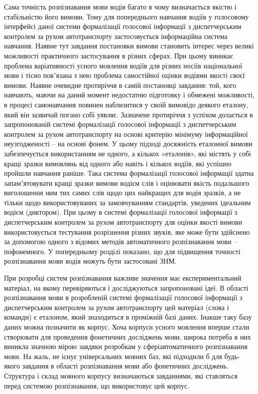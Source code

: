 Сама точність розпізнавання мови водія багато в чому визначається якістю і стабільністю його вимови. Тому для попереднього навчання водіїв у голосовому інтерфейсі даної системи формалізації голосової інформації з диспетчерським контролем за рухом автотранспорту застосовується інформаційна система навчання. Наявне тут завдання постановки вимови становить інтерес через великі можливості практичного застосування в різних сферах. При цьому виникає проблема варіативності усного мовлення водіїв для різних носіїв національної мови і тісно повʼязана з нею проблема самостійної оцінки водіями якості своєї вимови. Наявне очевидне протиріччя в самій постановці завдання: той, кого навчають, маючи  на даний момент недостатню підготовку і обмежені можливості, в процесі самонавчання повинен наблизитися у своїй вимовідо деякого еталону, який він  зазвичай погано собі уявляє. Зазначене протиріччя з успіхом долається в запропонованій системі формалізації голосової інформації з диспетчерським контролем за рухом автотранспорту на основі критерію мінімуму інформаційної неузгодженості – на основі фонем. У цьому підході досяжність еталонної вимови забезпечується використанням не одного, а кількох «еталонів», які містять у собі кращі зразки вимовлянь від одного або навіть і кількох водіїв, які успішно пройшли навчання раніше. Така система формалізації голосової інформації здатна запамʼятовувати кращі зразки вимови водієм слів і оцінювати якість подальшого виголошення ним тих самих слів щодо цих найкращих для водія зразків, а не тільки щодо використовуваних за замовчуванням стандартів, уведених ідеальним водієм (диктором). При цьому в системі формалізації голосової інформації з диспетчерським контролем за рухом автотранспорту для оцінки якості вимови використовується тестування розрізнення різних звуків, яке може бути здійснено за допомогою одного з відомих методів автоматичного розпізнавання мови – пофонемного. У попередньому розділі показано, що для підвищення точності розпізнавання мови водія можуть бути застосовані ЗНМ.

При розробці систем розпізнавання важливе значення має експериментальний матеріал, на якому перевіряються і досліджуються запропоновані ідеї. В області розпізнавання мови в розробленій системі формалізації голосової інформації з диспетчерським контролем за рухом автотранспорту цей матеріал (слова і команди) є еталоном, який знаходиться в проміжній базі даних. Інакше таку базу даних можна позначити як корпус. Хоча корпуси усного мовлення вперше стали створювати для проведення фонетичних досліджень мови, широка потреба в них виникла значною мірою завдяки розробкам у сферіавтоматичного розпізнавання мови. На жаль, не існує універсальних мовних баз, які підходили б для будь-якого завдання в області розпізнавання мови або фонетичних досліджень. Структура і склад мовного корпусу визначаються завданнями, які ставляться перед системою розпізнавання, що використовує цей корпус.

